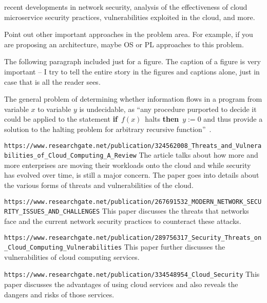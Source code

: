 recent developments in network security, analysis of the effectiveness of cloud
microservice security practices, vulnerabilities exploited in the cloud, and more.

Point out other important approaches in the problem area. For example, if you 
are proposing an architecture, maybe OS or PL approaches to this problem. 

The following paragraph included just for a figure. The caption of a figure is very
important -- I try to tell the entire story in the figures and captions alone, 
just in case that is all the reader sees.

The general problem of determining whether information flows in a program from
variable $x$ to variable $y$ is undecidable, as ``any procedure purported to
decide it could be applied to the statement {\bf if}~$f(x)$~halts {\bf then}~$y
:= 0$ and thus provide a solution to the halting problem for arbitrary
recursive function''~\cite{denning-impossible}.  

\verb|https://www.researchgate.net/publication/324562008_Threats_and_Vulnerabilities_of_Cloud_Computing_A_Review|
The article talks about how more and more enterprises are moving their workloads onto the cloud and while
security has evolved over time, is still a major concern. The paper goes into details about the various forms
of threats and vulnerabilities of the cloud.

\verb|https://www.researchgate.net/publication/267691532_MODERN_NETWORK_SECURITY_ISSUES_AND_CHALLENGES|
This paper discusses the threats that networks face and the current network security practices to counteract these attacks.

\verb|https://www.researchgate.net/publication/289756317_Security_Threats_on_Cloud_Computing_Vulnerabilities|
This paper further discusses the vulnerabilities of cloud computing services.

\verb|https://www.researchgate.net/publication/334548954_Cloud_Security|
This paper discusses the advantages of using cloud services and also reveals the dangers and risks of those services.
